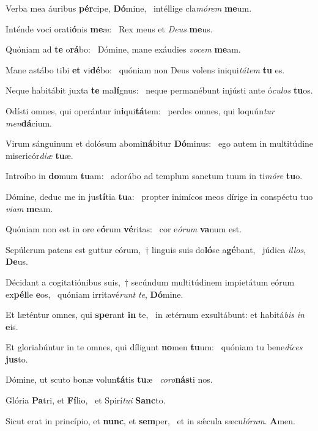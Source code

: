 \item Verba mea áuribus \textbf{pér}cipe, \textbf{Dó}mine,~\psstar{} intéllige cla\textit{mórem} \textbf{me}um.
\item Inténde voci orati\textbf{ó}nis \textbf{me}æ:~\psstar{} Rex meus et \textit{Deus} \textbf{me}us.
\item Quóniam ad \textbf{te} o\textbf{rá}bo:~\psstar{} Dómine, mane exáudies \textit{vocem} \textbf{me}am.
\item Mane astábo tibi \textbf{et} vi\textbf{dé}bo:~\psstar{} quóniam non Deus volens iniqui\textit{tátem} \textbf{tu} es.
\item Neque habitábit juxta \textbf{te} ma\textbf{lí}gnus:~\psstar{} neque permanébunt injústi ante ó\textit{culos} \textbf{tu}os.
\item Odísti omnes, qui operántur in\textbf{i}qui\textbf{tá}tem:~\psstar{} perdes omnes, qui loquún\textit{tur} \textit{men}\textbf{dá}cium.
\item Virum sánguinum et dolósum abomi\textbf{ná}bitur \textbf{Dó}minus:~\psstar{} ego autem in multitúdine misericór\textit{diæ} \textbf{tu}æ.
\item Introíbo in \textbf{do}mum \textbf{tu}am:~\psstar{} adorábo ad templum sanctum tuum in ti\textit{móre} \textbf{tu}o.
\item Dómine, deduc me in jus\textbf{tí}tia \textbf{tu}a:~\psstar{} propter inimícos meos dírige in conspéctu tuo \textit{viam} \textbf{me}am.
\item Quóniam non est in ore e\textbf{ó}rum \textbf{vé}ritas:~\psstar{} cor e\textit{órum} \textbf{va}num est.
\item Sepúlcrum patens est guttur eórum,~† linguis suis do\textbf{ló}se a\textbf{gé}bant,~\psstar{} júdica \textit{illos}, \textbf{De}us.
\item Décidant a cogitatiónibus suis,~† secúndum multitúdinem impietátum eórum ex\textbf{pél}le \textbf{e}os,~\psstar{} quóniam irritavé\textit{runt} \textit{te}, \textbf{Dó}mine.
\item Et læténtur omnes, qui \textbf{spe}rant \textbf{in} te,~\psstar{} in ætérnum exsultábunt: et habitá\textit{bis} \textit{in} \textbf{e}is.
\item Et gloriabúntur in te omnes, qui díligunt \textbf{no}men \textbf{tu}um:~\psstar{} quóniam tu bene\textit{díces} \textbf{jus}to.
\item Dómine, ut scuto bonæ volun\textbf{tá}tis \textbf{tu}æ~\psstar{} \textit{coro}\textbf{nás}ti nos.
\item Glória \textbf{Pa}tri, et \textbf{Fí}lio,~\psstar{} et Spirí\textit{tui} \textbf{Sanc}to.
\item Sicut erat in princípio, et \textbf{nunc}, et \textbf{sem}per,~\psstar{} et in sǽcula sæcu\textit{lórum}. \textbf{A}men.
